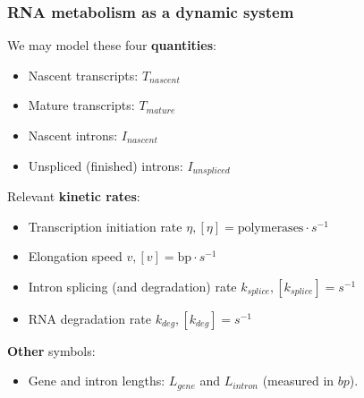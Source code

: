 \documentclass{beamer}
\begin{document}
	\begin{frame}
		\frametitle{RNA metabolism as a dynamic system}
		\pause
		We may model these four \textbf{quantities}:
		\begin{itemize}
			\item Nascent transcripts: $T_{nascent}$
			\item Mature transcripts: $T_{mature}$
			\item Nascent introns: $I_{nascent}$
			\item Unspliced (finished) introns: $I_{unspliced}$
		\end{itemize}	
		\pause
		Relevant \textbf{kinetic rates}:
		\pause
		\begin{itemize}
			\item Transcription initiation rate $\eta, [ \eta ] = \text{polymerases} \cdot s^{-1}$
			\pause
			\item Elongation speed $v, [ v ] = \text{bp} \cdot s^{-1}$
			\pause
			\item Intron splicing (and degradation) rate $k_{splice}, [k_{splice}] = s^{-1} $
			\pause
			\item RNA degradation rate $k_{deg}, [k_{deg}] = s^{-1}$
		\end{itemize}
		\pause
		\textbf{Other} symbols: 
		\begin{itemize}
			\item Gene and intron lengths: $L_{gene}$ and $L_{intron}$ (measured in $bp$).
		\end{itemize}
	\end{frame}
	
\end{document}
